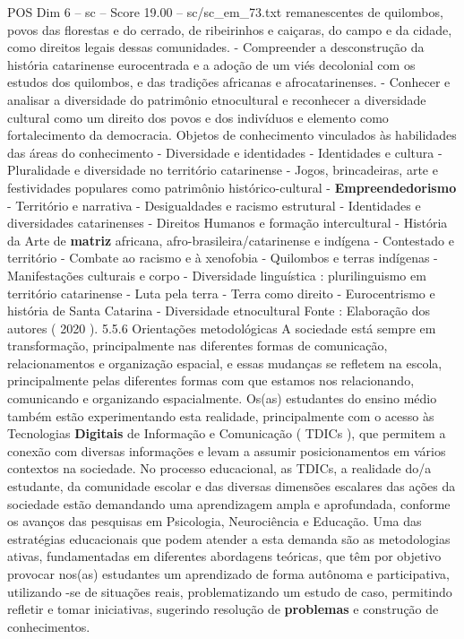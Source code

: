 \begin{textsample}{POS Dim 6 – sc – Score 19.00 – sc/sc\_em\_73.txt}
remanescentes de quilombos, povos das florestas e do cerrado, de ribeirinhos e caiçaras, do campo e da cidade, como direitos legais dessas comunidades. - Compreender a desconstrução da história catarinense eurocentrada e a adoção de um viés decolonial com os estudos dos quilombos, e das tradições africanas e afrocatarinenses. - Conhecer e analisar a diversidade do patrimônio etnocultural e reconhecer a diversidade cultural como um direito dos povos e dos indivíduos e elemento como fortalecimento da democracia.
Objetos de conhecimento vinculados às habilidades das áreas do conhecimento - Diversidade e identidades - Identidades e cultura - Pluralidade e diversidade no território catarinense - Jogos, brincadeiras, arte e festividades populares como patrimônio histórico-cultural - \textbf{Empreendedorismo} - Território e narrativa - Desigualdades e racismo estrutural - Identidades e diversidades catarinenses - Direitos Humanos e formação intercultural - História da Arte de \textbf{matriz} africana, afro-brasileira/catarinense e indígena - Contestado e território - Combate ao racismo e à xenofobia - Quilombos e terras indígenas - Manifestações culturais e corpo - Diversidade linguística : plurilinguismo em território catarinense - Luta pela terra - Terra como direito - Eurocentrismo e história de Santa Catarina - Diversidade etnocultural Fonte : Elaboração dos autores ( 2020 ). 5.5.6 Orientações metodológicas A sociedade está sempre em transformação, principalmente nas diferentes formas de comunicação, relacionamentos e organização espacial, e essas mudanças se refletem na escola, principalmente pelas diferentes formas com que estamos nos relacionando, comunicando e organizando espacialmente.
Os(as) estudantes do ensino médio também estão experimentando esta realidade, principalmente com o acesso às Tecnologias \textbf{Digitais} de Informação e Comunicação ( TDICs ), que permitem a conexão com diversas informações e levam a assumir posicionamentos em vários contextos na sociedade.
No processo educacional, as TDICs, a realidade do/a estudante, da comunidade escolar e das diversas dimensões escalares das ações da sociedade estão demandando uma aprendizagem ampla e aprofundada, conforme os avanços das pesquisas em Psicologia, Neurociência e Educação.
Uma das estratégias educacionais que podem atender a esta demanda são as metodologias ativas, fundamentadas em diferentes abordagens teóricas, que têm por objetivo provocar nos(as) estudantes um aprendizado de forma autônoma e participativa, utilizando -se de situações reais, problematizando um estudo de caso, permitindo refletir e tomar iniciativas, sugerindo resolução de \textbf{problemas} e construção de conhecimentos.

\end{textsample}
